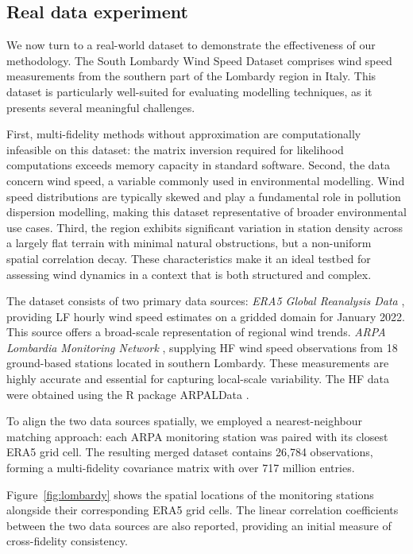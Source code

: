 \documentclass[12pt]{article}
\begin{document}
    
\subsection{Real data experiment} \label{Real_data_experiment}
We now turn to a real-world dataset to demonstrate the effectiveness of our methodology. The South Lombardy Wind Speed Dataset comprises wind speed measurements from the southern part of the Lombardy region in Italy. This dataset is particularly well-suited for evaluating modelling techniques, as it presents several meaningful challenges.

\noindent
\hangindent=-5mm
First, multi-fidelity methods without approximation are computationally infeasible on this dataset: the matrix inversion required for likelihood computations exceeds memory capacity in standard software. Second, the data concern wind speed, a variable commonly used in environmental modelling. Wind speed distributions are typically skewed and play a fundamental role in pollution dispersion modelling, making this dataset representative of broader environmental use cases. Third, the region exhibits significant variation in station density across a largely flat terrain with minimal natural obstructions, but a non-uniform spatial correlation decay. These characteristics make it an ideal testbed for assessing wind dynamics in a context that is both structured and complex.

\noindent
\hangindent=-5mm
The dataset consists of two primary data sources:  
\textit{ERA5 Global Reanalysis Data} \citep{ERA5}, providing LF hourly wind speed estimates on a gridded domain for January 2022. This source offers a broad-scale representation of regional wind trends.  
\textit{ARPA Lombardia Monitoring Network} \citep{ARPA_Lombardia, earth3010013}, supplying HF wind speed observations from 18 ground-based stations located in southern Lombardy. These measurements are highly accurate and essential for capturing local-scale variability. The HF data were obtained using the R package ARPALData \citep{maranzano2024arpaldata}.

\noindent
\hangindent=-5mm
To align the two data sources spatially, we employed a nearest-neighbour matching approach: each ARPA monitoring station was paired with its closest ERA5 grid cell. The resulting merged dataset contains 26,784 observations, forming a multi-fidelity covariance matrix with over 717 million entries.

\noindent
\hangindent=-5mm
Figure~\ref{fig:lombardy} shows the spatial locations of the monitoring stations alongside their corresponding ERA5 grid cells. The linear correlation coefficients between the two data sources are also reported, providing an initial measure of cross-fidelity consistency.
 
\end{document}
